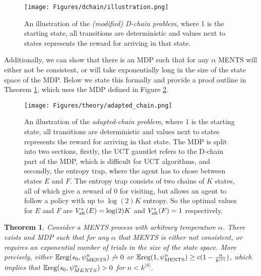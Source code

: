 \documentclass{article}
\newcommand{\Vss}[1]{V^*_{\textnormal{sft}}(#1)}
\newcommand{\reg}{\textnormal{reg}}
\theoremstyle{plain}
\newtheorem{theorem}{Theorem}[section]
\begin{document}
\begin{appendices}
        \begin{figure}
            \centering
            \texttt{[image: Figures/dchain/illustration.png]}
            \caption{An illustration of the \textit{(modified) D-chain problem}, where 1 is the starting state, all transitions are deterministic and values next to states represents the reward for arriving in that state.}
            \label{fig:dchain_illustration_tres}
        \end{figure}
        
        
        
        
        
        
        
        
        Additionally, we can show that there is an MDP such that for any $\alpha$ MENTS will either not be consistent, or will take exponentially long in the size of the state space of the MDP. Below we state this formally and provide a proof outline in Theorem \ref{thrm:ments_bad_mdp}, which uses the MDP defined in Figure \ref{fig:adapted_chain}. 
        
        \begin{figure}
            \centering
            \texttt{[image: Figures/theory/adapted\_chain.png]}
            \caption{An illustration of the \textit{adapted-chain problem}, where 1 is the starting state, all transitions are deterministic and values next to states represents the reward for arriving in that state. The MDP is split into two sections, firstly, the UCT gauntlet refers to the D-chain part of the MDP, which is difficult for UCT algorithms, and secondly, the entropy trap, where the agent has to chose between states $E$ and $F$. The entropy trap consists of two chains of $K$ states, all of which give a reward of $0$ for visiting, but allows an agent to follow a policy with up to $\log(2)K$ entropy. So the optimal values for $E$ and $F$ are $\Vss{E}=\log(2)K$ and $\Vss{F}=1$ respectively.}
            \label{fig:adapted_chain}
        \end{figure}
        
        
        
        
        
        
        
        \begin{theorem} \label{thrm:ments_bad_mdp}
        		Consider a MENTS process with arbitrary temperature $\alpha$. There exists and MDP such that for any $\alpha$ that MENTS is either not consistent, or requires an exponential number of trials in the size of the state space. More precisely, either $\mathbb{E}\reg(s_0,\psi^n_{\text{MENTS}})\not\rightarrow 0$ or $\mathbb{E}\reg(1,\psi^n_{\text{MENTS}}) \geq c(1 - \frac{n}{k^{|S|}})$, which implies that $\mathbb{E}\reg(s_0,\psi^n_{MENTS})>0$ for $n<k^{|S|}$. 
        \end{theorem}
        

\end{appendices}
\end{document}
